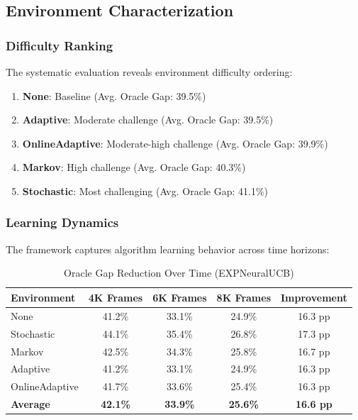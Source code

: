 \documentclass[11pt,a4paper]{article}
\begin{document}
\subsection{Environment Characterization}

\subsubsection{Difficulty Ranking}

The systematic evaluation reveals environment difficulty ordering:

\begin{enumerate}
\item \textbf{None}: Baseline (Avg. Oracle Gap: 39.5\%)
\item \textbf{Adaptive}: Moderate challenge (Avg. Oracle Gap: 39.5\%)  
\item \textbf{OnlineAdaptive}: Moderate-high challenge (Avg. Oracle Gap: 39.9\%)
\item \textbf{Markov}: High challenge (Avg. Oracle Gap: 40.3\%)
\item \textbf{Stochastic}: Most challenging (Avg. Oracle Gap: 41.1\%)
\end{enumerate}

\subsubsection{Learning Dynamics}

The framework captures algorithm learning behavior across time horizons:

\begin{table}[H]
\centering
\caption{Oracle Gap Reduction Over Time (EXPNeuralUCB)}
\begin{tabular}{|l|c|c|c|c|}
\hline
\textbf{Environment} & \textbf{4K Frames} & \textbf{6K Frames} & \textbf{8K Frames} & \textbf{Improvement} \\
\hline
\hline
None & 41.2\% & 33.1\% & 24.9\% & 16.3 pp \\
Stochastic & 44.1\% & 35.4\% & 26.8\% & 17.3 pp \\
Markov & 42.5\% & 34.3\% & 25.8\% & 16.7 pp \\
Adaptive & 41.2\% & 33.1\% & 24.9\% & 16.3 pp \\
OnlineAdaptive & 41.7\% & 33.6\% & 25.4\% & 16.3 pp \\
\hline
\textbf{Average} & \textbf{42.1\%} & \textbf{33.9\%} & \textbf{25.6\%} & \textbf{16.6 pp} \\
\hline
\end{tabular}
\end{table}
\end{document}
